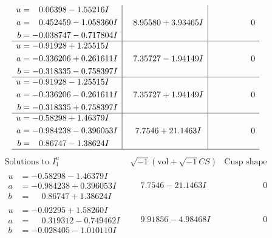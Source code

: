 \documentclass[1p]{elsarticle_modified}
\theoremstyle{definition}
\newcommand{\I}{\sqrt{-1}}
\begin{document}
$$\begin{array}{c|c|c}
\begin{aligned}
u &= \phantom{-}0.06398 - 1.55216 I \\
a &= \phantom{-}0.452459 - 1.058360 I \\
b &= -0.038747 - 0.717804 I\end{aligned}
 & \phantom{-}8.95580 + 3.93465 I & \phantom{-0.000000 } 0 \\ \hline\begin{aligned}
u &= -0.91928 + 1.25515 I \\
a &= -0.336206 + 0.261611 I \\
b &= -0.318335 - 0.758397 I\end{aligned}
 & \phantom{-}7.35727 - 1.94149 I & \phantom{-0.000000 } 0 \\ \hline\begin{aligned}
u &= -0.91928 - 1.25515 I \\
a &= -0.336206 - 0.261611 I \\
b &= -0.318335 + 0.758397 I\end{aligned}
 & \phantom{-}7.35727 + 1.94149 I & \phantom{-0.000000 } 0 \\ \hline\begin{aligned}
u &= -0.58298 + 1.46379 I \\
a &= -0.984238 - 0.396053 I \\
b &= \phantom{-}0.86747 - 1.38624 I\end{aligned}
 & \phantom{-}7.7546 + 21.1463 I & \phantom{-0.000000 } 0\\
 \hline 
 \end{array}$$\newpage$$\begin{array}{c|c|c}  
\text{Solutions to }I^u_{1}& \I (\text{vol} + \sqrt{-1}CS) & \text{Cusp shape}\\
 \hline 
\begin{aligned}
u &= -0.58298 - 1.46379 I \\
a &= -0.984238 + 0.396053 I \\
b &= \phantom{-}0.86747 + 1.38624 I\end{aligned}
 & \phantom{-}7.7546 - 21.1463 I & \phantom{-0.000000 } 0 \\ \hline\begin{aligned}
u &= -0.02295 + 1.58260 I \\
a &= \phantom{-}0.319312 - 0.749462 I \\
b &= -0.028405 - 1.010110 I\end{aligned}
 & \phantom{-}9.91856 - 4.98468 I & \phantom{-0.000000 } 0 \\ \hline\begin{aligned}

\end{aligned}
\end{array}$$
\end{document}
